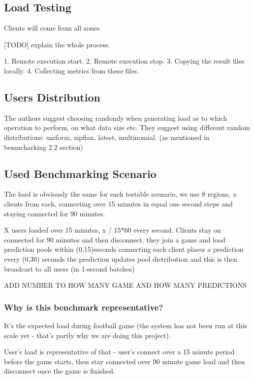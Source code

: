 \documentclass{uvamscse}
\begin{document}
\subsection{Load Testing}

Clients will come from all zones

[TODO] explain the whole process.

1. Remote execution start.
2. Remote execution stop.
3. Copying the result files locally.
4. Collecting metrics from these files.

\subsection{Users Distribution}
The authors suggest choosing randomly when generating load as to which operation to perform, on what data size etc. They suggest using different random distributions: uniform, zipfian, latest, multinomial\cite{Ycsb}. (as mentioned in bemncharking 2.2 section)

\subsection{Used Benchmarking Scenario}\label{Used Benchmarking Scenario}

The load is obviously the same for each testable scenario, we use 8 regions, x clients from each, connecting over 15 minutes in equal one second steps and staying connected for 90 minutes.

X users loaded over 15 minutes, x / 15*60 every second.
Clients stay on connected for 90 minutes and then disconnect.
they join a game and load prediction pools within (0,15)seconds connecting
each client places a prediction every (0,30) seconds
the prediction updates pool distribution and this is then broadcast to all users (in 1-second batches)

ADD NUMBER TO HOW MANY GAME AND HOW MANY PREDICTIONS

\subsubsection{Why is this benchmark representative?}

It's the expected load during football game (the system has not been run at this scale yet - that's partly why we are doing this project).

User's load is representative of that - user's connect over a 15 minute period before the game starts, then stay connected over 90 minute game load and then disconnect once the game is finished.
\end{document}
